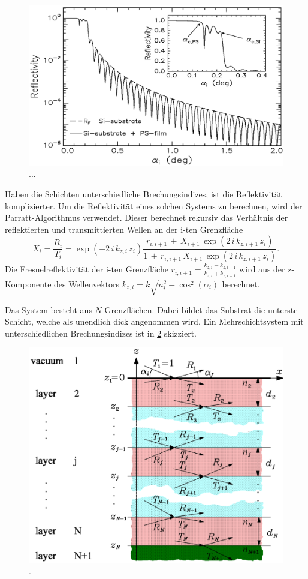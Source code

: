 \begin{figure}
    \centering
    \includegraphics[width=0.7\linewidth]{./figures/Kurve.png}
    \caption{...}
    \label{fig:Kurve}
\end{figure}

Haben die Schichten unterschiedliche Brechungsindizes, ist die Reflektivität komplizierter. Um die Reflektivität eines solchen Systems zu berechnen, wird der Parratt-Algorithmus verwendet.
Dieser berechnet rekursiv das Verhältnis der reflektierten und transmittierten Wellen an der i-ten Grenzfläche
\begin{equation}
    X_i = \frac{R_i}{T_i} = \exp(-2 \, i \, k_{z,i} \, z_i) \frac{r_{i, i+1} \, + \, X_{i+1} \, \exp(2 \, i \, k_{z,i+1} \, z_i)}{1 \, + \, r_{i,i+1} \, X_{i+1} \, \exp(2 \, i \, k_{z,i+1} \, z_i)}.
\end{equation}
Die Fresnelreflektivität der i-ten Grenzfläche $r_{i, i+1} = \frac{k_{z,i} - k_{z,i+1}}{k_{z,i} + k_{z,i+1}}$ wird aus der z-Komponente des Wellenvektors $k_{z,i} = k \sqrt{n^2_i - \cos^2(\alpha_i)}$ berechnet.

Das System besteht aus $N$ Grenzflächen. Dabei bildet das Substrat die unterste Schicht, welche als unendlich dick angenommen wird.
Ein Mehrschichtsystem mit unterschiedlichen Brechungsindizes ist in \ref{fig:Mehrschicht} skizziert.

\begin{figure}
    \centering
    \includegraphics[width=0.7\linewidth]{./figures/Mehrschicht.png}
    \caption{.}
    \label{fig:Mehrschicht}
\end{figure}



